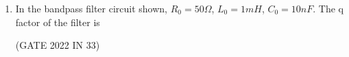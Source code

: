 \begin{enumerate}[label=\thechapter.\arabic*,ref=\thechapter.\theenumi]
\item In the bandpass filter circuit shown, $R_0 = 50\Omega$, $L_0 = 1 mH$, $C_0 = 10nF$. The q factor of the filter is 

\hfill(GATE 2022 IN 33)\\
\solution

\pagebreak
\end{enumerate}
